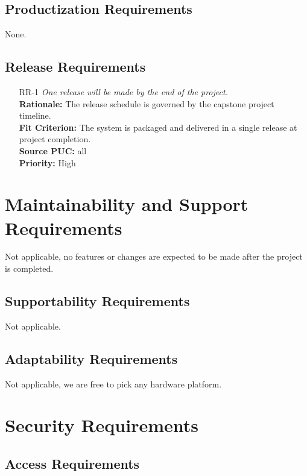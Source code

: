 \documentclass[12pt]{article}
\begin{document}
\subsection{Productization Requirements}

None.

\subsection{Release Requirements}
\begin{itemize}[leftmargin=*]
  \item[RR-1] \emph{One release will be made by the end of the project.}\\[2mm]
        \textbf{Rationale:} The release schedule is governed by the capstone project timeline.\\
        \textbf{Fit Criterion:} The system is packaged and delivered in a single release at project completion.\\
        \textbf{Source PUC:} all \\
        \textbf{Priority:} High
\end{itemize}

\section{Maintainability and Support Requirements}

Not applicable, no features or changes are expected to be made after the
project is completed.

\subsection{Supportability Requirements}

Not applicable.

\subsection{Adaptability Requirements}

Not applicable, we are free to pick any hardware platform.

\section{Security Requirements}
\subsection{Access Requirements}
\end{document}
